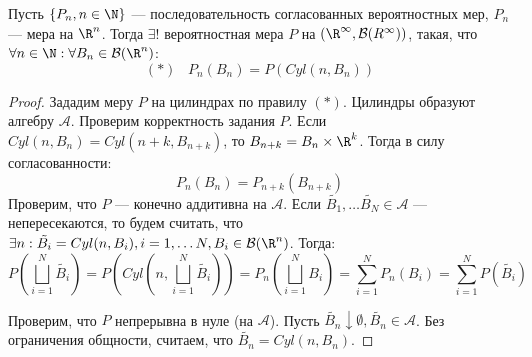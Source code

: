 \begin{theorem}
    Пусть \(\{P_n, n \in \N\}\) --- последовательность согласованных вероятностных мер, \(P_n\) --- мера на \(\R^n\). Тогда \(\exists !\) вероятностная мера \(P\) на \((\R^\infty, \mathcal{B}(R^\infty))\), такая, что \(\forall n \in \N: \forall B_n \in \mathcal{B}(\R^n)\):
    \[(*)\;\;\;P_n(B_n) = P(Cyl(n, B_n))\]
\end{theorem}
\begin{proof}
    Зададим меру \(P\) на цилиндрах по правилу \((*)\). Цилиндры образуют алгебру \(\mathcal{A}\). Проверим корректность задания \(P\). Если \(Cyl(n, B_n) = Cyl(n + k, B_{n + k})\), то \(B_{n + k} = B_n \times \R^k\). Тогда в силу согласованности:
    \[P_n(B_n) = P_{n + k}(B_{n + k})\]
    Проверим, что \(P\) --- конечно аддитивна на \(\mathcal{A}\). Если \(\tilde{B_1}, \dots \tilde{B_N} \in \mathcal{A}\) --- непересекаются, то будем считать, что \(\exists n: \tilde{B_i} = Cyl(n, B_i), i = 1, \dots N, B_i \in \mathcal{B}(\R^n)\). Тогда:
    \[P\left( \bigsqcup_{i = 1}^N \tilde{B_i} \right) = P\left( Cyl\left( n, \bigsqcup_{i = 1}^N \tilde{B_i} \right) \right) = P_n\left( \bigsqcup_{i = 1}^N B_i \right) = \sum_{i = 1}^N P_n(B_i) = \sum_{i = 1}^N P(\tilde{B_i})\]

    Проверим, что \(P\) непрерывна в нуле (на \(\mathcal{A}\)). Пусть \(\tilde{B_n} \downarrow \emptyset, \tilde{B_n} \in \mathcal{A}\). Без ограничения общности, считаем, что \(\tilde{B_n} = Cyl(n, B_n)\). 


\end{proof}
